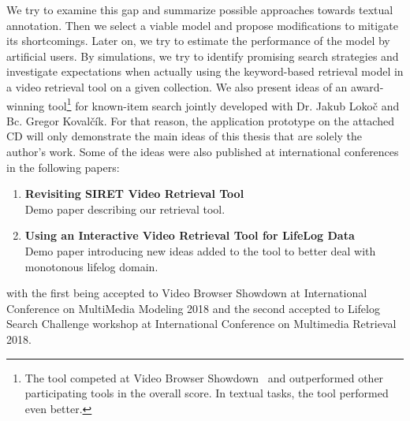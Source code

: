 We try to examine this gap and summarize possible approaches towards textual annotation. Then we select a viable model and propose modifications to mitigate its shortcomings. Later on, we try to estimate the performance of the model by artificial users. By simulations, we try to identify promising search strategies and investigate expectations when actually using the keyword-based retrieval model in a video retrieval tool on a given collection. We also present ideas of an award-winning tool\footnote{The tool competed at Video Browser Showdown~\cite{cobarzan2017interactive} and outperformed other participating tools in the overall score. In textual tasks, the tool performed even better.} for known-item search jointly developed with Dr. Jakub Lokoč and Bc. Gregor Kovalčík. For that reason, the application prototype on the attached CD will only demonstrate the main ideas of this thesis that are solely the author's work. Some of the ideas were also published at international conferences in the following papers:
\begin{enumerate}
	\item \textbf{Revisiting SIRET Video Retrieval Tool}~\cite{lokovc2018revisiting}\\
	Demo paper describing our retrieval tool.
	\item \textbf{Using an Interactive Video Retrieval Tool for LifeLog Data}~\cite{LokocLSC}\\
	Demo paper introducing new ideas added to the tool to better deal with monotonous lifelog domain.
\end{enumerate}
with the first being accepted to Video Browser Showdown at International Conference on MultiMedia Modeling 2018 and the second accepted to Lifelog Search Challenge workshop at International Conference on Multimedia Retrieval 2018.
